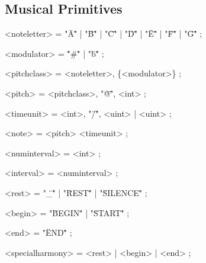 \documentclass{article}
\begin{document}
\subsection{Musical Primitives}
\begin{grammar}
<noteletter> = "\"A\"" | "\"B\"" | "\"C\"" |  "\"D\"" | "\"E\"" | "\"F\"" |  "\"G\"" ;

<modulator> = "\"#\"" | "\"b\"" ; %

<pitchclass> = <noteletter>, \{<modulator>\} ;

<pitch> = <pitchclass>, "\"@\"", <int> ;

<timeunit> = <int>, "\"/\"", <uint> | <uint> ;

<note> = <pitch> <timeunit> ;

<numinterval> = <int> ;





<interval> = <numinterval> ;

<rest> = "\"\_\"" | "\"REST\"" | "\"SILENCE\"" ;

<begin> = "\"BEGIN\"" | "\"START\"" ;

<end> = "\"END\"" ;

<specialharmony> = <rest> | <begin> | <end> ; %


\end{grammar}
\end{document}
